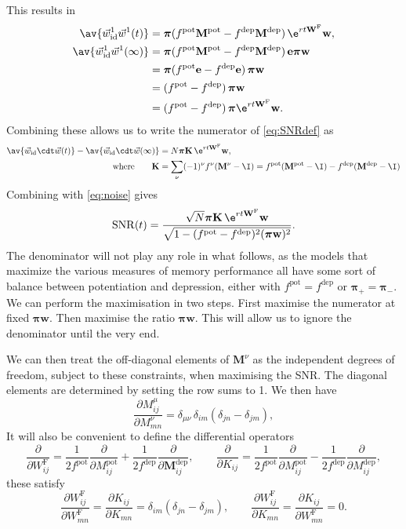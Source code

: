 \documentclass[12pt]{article}
\newcommand{\onev}{\mathbf{e}}
\newcommand{\eqm}{\pi}
\newcommand{\eq}{\boldsymbol{\eqm}}
\newcommand{\wm}{w}
\newcommand{\w}{\mathbf{\wm}}
\newcommand{\Wm}{W}
\newcommand{\W}{\mathbf{\Wm}}
\newcommand{\MMdm}{M}
\newcommand{\MMd}{\mathbf{\MMdm}}
\newcommand{\encm}{K}
\newcommand{\enc}{\mathbf{\encm}}
\newcommand{\frgm}{\Wm^{\mathrm{F}}}
\newcommand{\frg}{\W^{\mathrm{F}}}
\newcommand{\pot}{^{\text{pot}}}
\newcommand{\dep}{^{\text{dep}}}
\newcommand{\syn}{\vec{w}}
\newcommand{\synid}{\syn_\text{id}}
\DeclareMathOperator{\SNR}{SNR}
\renewcommand{\pdiff}[2]{\frac{\partial #1}{\partial #2}}
\begin{document}
This results in
%
\begin{equation}\label{eq:overlapwt}
\begin{aligned}
  \av{\synid^1 \syn^1(t)} &= \eq (f\pot \MMd \pot-f\dep \MMd \dep)\, \e^{rt\frg} \w, \\
  \av{\synid^1 \syn^1(\infty)} &= \eq (f\pot \MMd \pot-f\dep \MMd \dep)\, \onev\eq \w \\
         &= \eq (f\pot\onev-f\dep\onev)\, \eq \w \\
         &=  (f\pot-f\dep)\, \eq \w \\
         &=  (f\pot-f\dep)\, \eq \e^{rt\frg} \w .
\end{aligned}
\end{equation}
%
Combining these allows us to write the numerator of \eqref{eq:SNRdef} as
%
\begin{equation}\label{eq:signal}
\begin{aligned}
  \av{\synid \cdt \syn(t)} - \av{\synid \cdt \syn(\infty)}
    &= N \eq \enc \, \e^{rt \frg} \w , \\
    \text{where} \qquad
  \enc &= \sum_\nu (-1)^\nu f^\nu (\MMd^\nu - \I)
    = f\pot(\MMd \pot-\I)-f\dep(\MMd \dep-\I)
\end{aligned}
\end{equation}
%
Combining with \eqref{eq:noise} gives
%
\begin{equation}\label{eq:SNRcurveExact}
  \SNR(t) = \frac{\sqrt{N} \eq \enc\,\e^{rt \frg}\w}
                 {\sqrt{1-(f\pot-f\dep)^2(\eq \w)^2}}.
\end{equation}
%
The denominator will not play any role in what follows, as the models that maximize the various measures of memory performance all have some sort of balance between potentiation and depression, either with $f\pot=f\dep$ or $\eq_+=\eq_-$.
We can perform the maximisation in two steps.
First maximise the numerator at fixed $\eq \w$.
Then maximise the ratio \wrt $\eq\w$.
This will allow us to ignore the denominator until the very end.


We can then treat the off-diagonal elements of $\MMd^\nu$ as the independent degrees of freedom, subject to these constraints, when maximising the SNR.
The diagonal elements are determined by setting the row sums to 1.
We then have
%
\begin{equation}\label{eq:derivpd}
  \pdiff{\MMdm^\mu_{ij}}{\MMdm^\nu_{mn}} 
      = \delta_{\mu\nu}\, \delta_{im}(\delta_{jn}-\delta_{jm}),
\end{equation}
%
It will also be convenient to define the differential operators
%
\begin{equation}\label{eq:pertfe}
  \pdiff{}{\frgm_{ij}} = \frac{1}{2f\pot} \pdiff{}{\MMdm \pot_{ij}} + \frac{1}{2f\dep} \pdiff{}{\MMd \dep_{ij}},
  \qquad
  \pdiff{}{\encm_{ij}} = \frac{1}{2f\pot} \pdiff{}{\MMdm \pot_{ij}} - \frac{1}{2f\dep} \pdiff{}{\MMdm \dep_{ij}},
\end{equation}
%
these satisfy
%
\begin{equation}\label{eq:derivfe}
  \pdiff{\frgm_{ij}}{\frgm_{mn}} = \pdiff{\encm_{ij}}{\encm_{mn}} = \delta_{im}(\delta_{jn}-\delta_{jm}),
  \qquad
  \pdiff{\frgm_{ij}}{\encm_{mn}} = \pdiff{\encm_{ij}}{\frgm_{mn}} = 0.
\end{equation}
%
\end{document}
